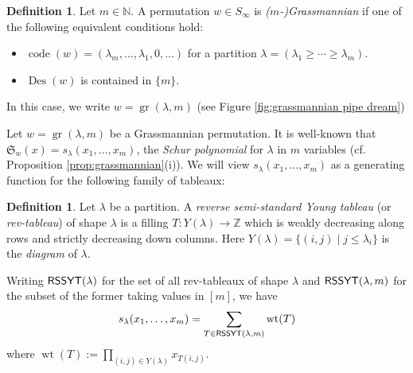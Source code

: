 \documentclass[11pt,reqno]{amsart} %
\newcommand{\bbN}{\mathbb{N}}
\newcommand{\bbZ}{\mathbb{Z}}
\newcommand{\frakS}{\mathfrak{S}}
\DeclareMathOperator{\code}{code}
\DeclareMathOperator{\Grass}{gr}
\DeclareMathOperator{\Des}{Des}
\DeclareMathOperator{\wt}{wt}
\DeclareMathOperator{\RSSYT}{\sf{RSSYT}}
\theoremstyle{definition}
\newtheorem{definition}[theorem]{Definition}
\begin{document}
\begin{definition}
Let $m\in\bbN$.
A permutation $w\in S_\infty$ is \textit{($m$-)Grassmannian} if one of the following equivalent conditions hold:
\begin{itemize}
    \item
    $\code(w) = (\lambda_m,\dots,\lambda_1,0,\dots)$ for a partition $\lambda = (\lambda_1\geq \cdots\geq \lambda_m)$.
    \item 
    $\Des(w)$ is contained in $\{m\}$.
\end{itemize}
In this case, we write $w = \Grass(\lambda,m)$ (see Figure \ref{fig:grassmannian pipe dream})
\end{definition}

Let $w = \Grass(\lambda,m)$ be a Grassmannian permutation.
It is well-known that $\frakS_w(x) = s_\lambda(x_1,\dots,x_m)$, the \textit{Schur polynomial} for $\lambda$ in $m$ variables (cf. Proposition \ref{prop:grassmannian}(i)).
We will view $s_\lambda(x_1,\dots,x_m)$ as a generating function for the following family of tableaux:

\begin{definition}
\label{def:rev ssyt}
Let $\lambda$ be a partition.
A \textit{reverse semi-standard Young tableau} (or \textit{rev-tableau}) of shape $\lambda$ is a filling $T\colon Y(\lambda)\to \bbZ$ which is weakly decreasing along rows and strictly decreasing down columns.
Here $Y(\lambda) = \{(i,j) \mid j \leq \lambda_i\}$ is the \textit{diagram} of $\lambda$.
\end{definition}

\noindent
Writing $\RSSYT(\lambda)$ for the set of all rev-tableaux of shape $\lambda$ and $\RSSYT(\lambda,m)$ for the subset of the former taking values in $[m]$, we have \[
    s_\lambda(x_1,\dots,x_m) =
    \sum_{T\in \RSSYT(\lambda,m)} \wt(T)
\] where $\wt(T) := \prod_{(i,j)\in Y(\lambda)} x_{T(i,j)}$.
\end{document}
